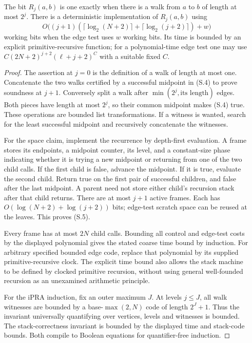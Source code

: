 \begin{theorem}
\label{thm:S05}
The bit $R_j(a,b)$ is one exactly when there is a walk from $a$ to $b$
of length at most $2^j$.  There is a deterministic implementation of
$R_j(a,b)$ using
\[
 O\bigl((j+1)(\lceil\log_2(N+2)\rceil+
                    \lceil\log_2(j+2)\rceil)+w\bigr)
 \tag{S.5}
\]
working bits when the edge test uses $w$ working bits.  Its time is
bounded by an explicit primitive-recursive function; for a polynomial-time
edge test one may use
$C(2N+2)^{j+2}(\ell+j+2)^C$ with a suitable fixed $C$.
\end{theorem}
\begin{proof}
The assertion at $j=0$ is the definition of a walk of length at most
one.  Concatenate the two walks certified by a successful midpoint in
(S.4) to prove soundness at $j+1$.  Conversely split a walk after
$\min(2^j,\text{its length})$ edges.  Both pieces have length at most
$2^j$, so their common midpoint makes (S.4) true.  These operations
are bounded list transformations.  If a witness is wanted, search for
the least successful midpoint and recursively concatenate the witnesses.

For the space claim, implement the recurrence by depth-first evaluation.
A frame stores its endpoints, a midpoint counter, its level, and a
constant-size phase indicating whether it is trying a new midpoint or
returning from one of the two child calls.  If the first child is false,
advance the midpoint.  If it is true, evaluate the second child.  Return
true on the first pair of successful children, and false after the last
midpoint.  A parent need not store either child's recursion stack after
that child returns.  There are at most $j+1$ active frames.  Each has
$O(\log(N+2)+\log(j+2))$ bits; edge-test scratch space can be reused
at the leaves.  This proves (S.5).

Every frame has at most $2N$ child calls.  Bounding all control and
edge-test costs by the displayed polynomial gives the stated coarse
time bound by induction.  For arbitrary specified bounded edge code,
replace that polynomial by its supplied primitive-recursive clock.
The explicit time bound also allows the stack machine to be defined by
clocked primitive recursion, without using general well-founded recursion
as an unexamined arithmetic principle.

For the iPRA induction, fix an outer maximum $J$.  At levels $j\leq J$,
all walk witnesses are bounded by a base-$\max(2,N)$ code of length
$2^J+1$.  Thus the invariant universally quantifying over vertices,
levels and witnesses is bounded.  The stack-correctness invariant is
bounded by the displayed time and stack-code bounds.  Both compile to
Boolean equations for quantifier-free induction.
\end{proof}

